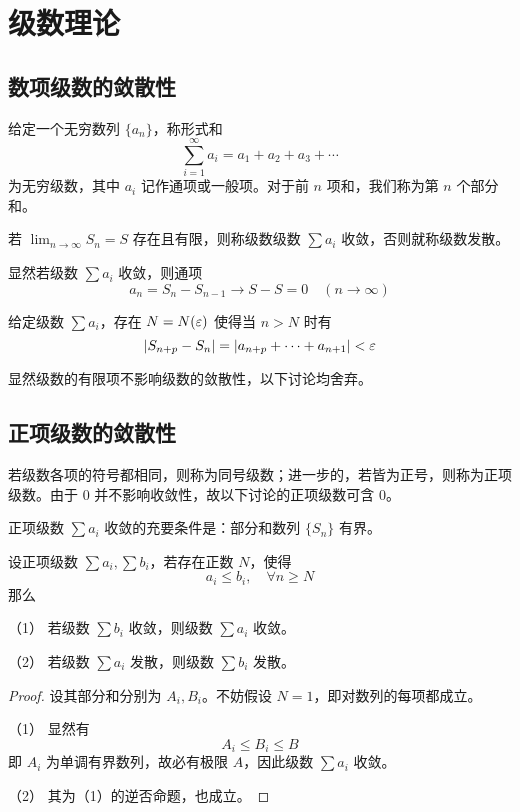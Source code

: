 \chapter{级数理论}

\section{数项级数的敛散性}

给定一个无穷数列 $\{a_n\}$，称形式和
\[ \sum_{i=1}^\infty a_i = a_1 + a_2 + a_3 + \cdots \]
为无穷级数，其中 $a_i$ 记作通项或一般项。对于前 $n$ 项和，我们称为第 $n$ 个部分和。

若 $\lim_{n \to \infty} S_n = S$ 存在且有限，则称级数级数 $\sum a_i$ 收敛，否则就称级数发散。

显然若级数 $\sum a_i$ 收敛，则通项
\[ a_n = S_n - S_{n-1} \to S - S = 0 \quad(n \to \infty) \]

\begin{theorem}[Cauchy 准则]
	给定级数 $\sum a_i$，存在 $N = N(\varepsilon)$ 使得当 $n > N$ 时有
	\[ |S_{n+p} - S_{n}| = |a_{n+p} + \cdots + a_{n+1}| < \varepsilon \]
\end{theorem}

显然级数的有限项不影响级数的敛散性，以下讨论均舍弃。

\section{正项级数的敛散性}

若级数各项的符号都相同，则称为同号级数；进一步的，若皆为正号，则称为正项级数。由于 $0$ 并不影响收敛性，故以下讨论的正项级数可含 $0$。

\begin{theorem}[基本判别法]
	正项级数 $\sum a_i$ 收敛的充要条件是：部分和数列 $\{S_n\}$ 有界。
\end{theorem}

\begin{theorem}[比较原则]
	设正项级数 $\sum a_i, \sum b_i$，若存在正数 $N$，使得
	\[ a_i \leqslant b_i, \quad \forall n \geqslant N \]
	那么
	
	（1） 若级数 $\sum b_i$ 收敛，则级数 $\sum a_i$ 收敛。
	
	（2） 若级数 $\sum a_i$ 发散，则级数 $\sum b_i$ 发散。
\end{theorem}

\begin{proof}
	设其部分和分别为 $A_i, B_i$。不妨假设 $N=1$，即对数列的每项都成立。
	
	（1） 显然有
	\[ A_i \leqslant B_i \leqslant B \]
	即 $A_i$ 为单调有界数列，故必有极限 $A$，因此级数 $\sum a_i$ 收敛。
	
	（2） 其为（1）的逆否命题，也成立。
\end{proof}

